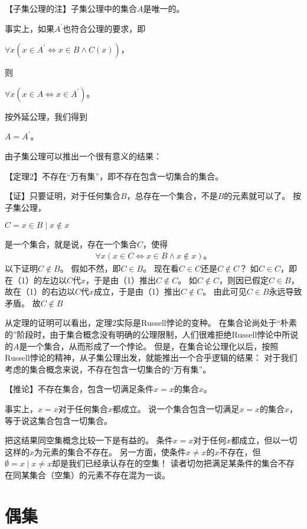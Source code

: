 【子集公理的注】子集公理中的集合$A$是唯一的。

事实上，如果$A^{'}$也符合公理的要求，即
\begin{center}
$\forall x (x \in A^{'} \Leftrightarrow x \in B \land C(x))$，
\end{center}
则
\begin{center}
$\forall x (x \in A \Leftrightarrow x \in A^{'})$。
\end{center}
按外延公理，我们得到
\begin{center}
$A=A^{'}$。
\end{center}

由子集公理可以推出一个很有意义的结果：

【定理2】不存在“万有集”，即不存在包含一切集合的集合。

【证】只要证明，对于任何集合$B$，总存在一个集合，不是$B$的元素就可以了。
按子集公理，
\begin{center}
$C={x \in B \mid x \notin x}$
\end{center}
是一个集合，就是说，存在一个集合$C$，使得
\begin{align}
\forall x (x \in C \Leftrightarrow x \in B \land x \notin x)。 \tag{1}
\end{align}
以下证明$C \notin B$。
假如不然，即$C \in B$。
现在看$C \in C$还是$C \notin C$？
如$C \in C$，即在（1）的左边以$C$代$x$，于是由（1）推出$C \notin C$。
如$C \notin C$，则因已假定$C \in B$，故在（1）的右边以$C$代$x$成立，于是由（1）推出$C \notin C$。
由此可见$C \in B$永远导致矛盾。
故$C \notin B$

从定理的证明可以看出，定理2实际是Russell悖论的变种。
在集合论尚处于“朴素的”阶段时，由于集合概念没有明确的公理限制，人们很难拒绝Russell悖论中所说的$A$是一个集合，从而形成了一个悖论。
但是，在集合论公理化以后，按照Russell悖论的精神，从子集公理出发，就能推出一个合乎逻辑的结果：
对于我们考虑的集合概念来说，不存在包含一切集合的“万有集”。

【推论】不存在集合，包含一切满足条件$x=x$的集合$x$。

事实上，$x=x$对于任何集合$x$都成立。
说一个集合包含一切满足$x=x$的集合$x$，等于说这集合包含一切集合。

把这结果同空集概念比较一下是有益的。
条件$x=x$对于任何$x$都成立，但以一切这样的$x$为元素的集合不存在。
另一方面，使条件$x \neq x$的$x$不存在，但$\emptyset={x \mid x \neq x}$却是我们已经承认存在的空集！
读者切勿把满足某条件的集合不存在同某集合（空集）的元素不存在混为一谈。

\section{偶集}

